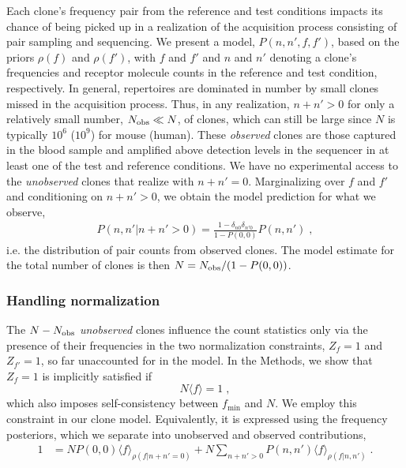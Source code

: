 \documentclass[letterpaper,english,prl,reprint,longbibliography]{revtex4-1} %
\begin{document}
Each clone's frequency pair from the reference and test conditions impacts its chance of being picked up in a realization of the acquisition process consisting of pair sampling and sequencing. 
We present a model, $P(n,n',f,f')$, based on the priors $\rho(f)$ and $\rho(f')$, with $f$ and $f'$ and $n$ and $n'$ denoting a clone's frequencies and receptor molecule counts in the reference and test condition, respectively. In general, repertoires are dominated in number by small clones missed in the acquisition process. Thus, in any realization, $n+n'>0$ for only a relatively small number, $N_{\textrm{\textrm{obs}}}\ll N$, of clones, which can still be large since $N$ is typically $ 10^6$ ($10^9$) for mouse (human). These \emph{observed} clones are those captured in the blood sample and amplified above detection levels in the sequencer in at least one of the test and reference conditions. We have no experimental access to the \emph{unobserved} clones that realize with $n+n'=0$. Marginalizing over $f$ and $f'$ and conditioning on $n+n'>0$, we obtain the model prediction for what we observe, 
\begin{align}
	P(n,n'|n+n'>0)=\frac{1-\delta_{n0}\delta_{n'0}}{1-P(0,0)}P(n,n')\;,
\end{align} 
i.e. the distribution of pair counts from observed clones. The model estimate for the total number of clones is then $N=N_{\textrm{\textrm{obs}}}/(1-P(0,0))$. 
\subsubsection*{Handling normalization}
The $N-N_{\textrm{\textrm{obs}}}$ \emph{unobserved} clones influence the count statistics only via the presence of their frequencies in the two normalization constraints, $Z_f=1$ and $Z_{f'}=1$, so far unaccounted for in the model.
In the Methods, we show that $Z_f=1$ is implicitly satisfied if 
\begin{equation}
	N\langle f\rangle=1\;,\label{eq:orignorm}
\end{equation}
which also imposes self-consistency between $f_\textrm{min}$ and $N$. We employ this constraint in our clone model. Equivalently, it is expressed using the frequency posteriors, which we separate into unobserved and observed contributions,
\begin{align*}
	1&= NP(0,0) \langle f\rangle_{\rho(f|n+n'=0)}+	N\sum_{n+n'>0}P(n,n')\langle f\rangle_{\rho(f|n,n')}\;.
\end{align*}
\end{document}
